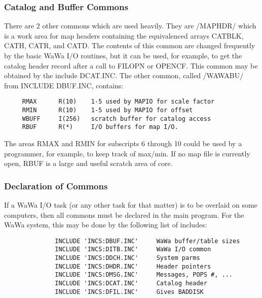\subsubsection{Catalog and Buffer Commons}
There are 2 other commons which are used heavily.  They are /MAPHDR/
which is a work area for map headers containing the equivalenced
arrays CATBLK, CATH, CATR, and CATD.  The contents of this common are changed
frequently by the basic WaWa I/O routines, but it can be used, for
example, to get the catalog header record after a call to FILOPN or
OPENCF. This common may be obtained by the include DCAT.INC.
The other common, called /WAWABU/ from  INCLUDE DBUF.INC, contains:

\begin{verbatim}
     RMAX      R(10)    1-5 used by MAPIO for scale factor
     RMIN      R(10)    1-5 used by MAPIO for offset
     WBUFF     I(256)   scratch buffer for catalog access
     RBUF      R(*)     I/O buffers for map I/O.

\end{verbatim}
The areas RMAX and RMIN for subscripts 6 through 10 could be used by a
programmer, for example, to keep track of max/min. If no map file is
currently open, RBUF is a large and useful scratch area of core.

\subsubsection{Declaration of Commons}
If a WaWa I/O task (or any other task for that matter) is to be
overlaid on some computers, then all commons must be declared in the
main program.  For the WaWa system, this may be done by the following
list of includes:

\begin{verbatim}
              INCLUDE 'INCS:DBUF.INC'     WaWa buffer/table sizes
              INCLUDE 'INCS:DITB.INC'     WaWa I/O common
              INCLUDE 'INCS:DDCH.INC'     System parms
              INCLUDE 'INCS:DHDR.INC'     Header pointers
              INCLUDE 'INCS:DMSG.INC'     Messages, POPS #, ...
              INCLUDE 'INCS:DCAT.INC'     Catalog header
              INCLUDE 'INCS:DFIL.INC'     Gives BADDISK


\end{verbatim}

